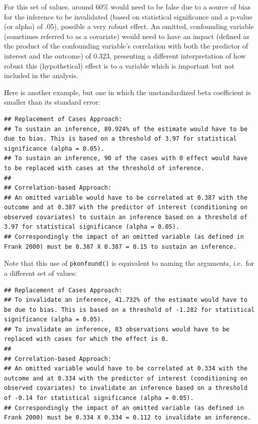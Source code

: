 \documentclass[man]{apa6}
\theoremstyle{definition}
\theoremstyle{definition}
\theoremstyle{definition}
\theoremstyle{remark}
\begin{document}
For this set of values, around 60\% would need to be false due to a
source of bias for the inference to be invalidated (based on statistical
significance and a p-value (or alpha) of .05), possible a very robust
effect. An omitted, confounding variable (sometimes referred to as a
covariate) would need to have an impact (defined as the product of the
confounding variable's correlation with both the predictor of interest
and the outcome) of 0.323, presenting a different interpretation of how
robust this (hypothetical) effect is to a variable which is important
but not included in the analysis.

Here is another example, but one in which the unstandardized beta
coefficient is smaller than its standard error:

\begin{verbatim}
## Replacement of Cases Approach:
## To sustain an inference, 89.924% of the estimate would have to be due to bias. This is based on a threshold of 3.97 for statistical significance (alpha = 0.05).
## To sustain an inference, 90 of the cases with 0 effect would have to be replaced with cases at the threshold of inference.
## 
## Correlation-based Approach:
## An omitted variable would have to be correlated at 0.387 with the outcome and at 0.387 with the predictor of interest (conditioning on observed covariates) to sustain an inference based on a threshold of 3.97 for statistical significance (alpha = 0.05).
## Correspondingly the impact of an omitted variable (as defined in Frank 2000) must be 0.387 X 0.387 = 0.15 to sustain an inference.
\end{verbatim}

Note that this use of \texttt{pkonfound()} is equivalent to naming the
arguments, i.e.~for a different set of values:

\begin{verbatim}
## Replacement of Cases Approach:
## To invalidate an inference, 41.732% of the estimate would have to be due to bias. This is based on a threshold of -1.282 for statistical significance (alpha = 0.05).
## To invalidate an inference, 83 observations would have to be replaced with cases for which the effect is 0.
## 
## Correlation-based Approach:
## An omitted variable would have to be correlated at 0.334 with the outcome and at 0.334 with the predictor of interest (conditioning on observed covariates) to invalidate an inference based on a threshold of -0.14 for statistical significance (alpha = 0.05).
## Correspondingly the impact of an omitted variable (as defined in Frank 2000) must be 0.334 X 0.334 = 0.112 to invalidate an inference.
\end{verbatim}
\end{document}
